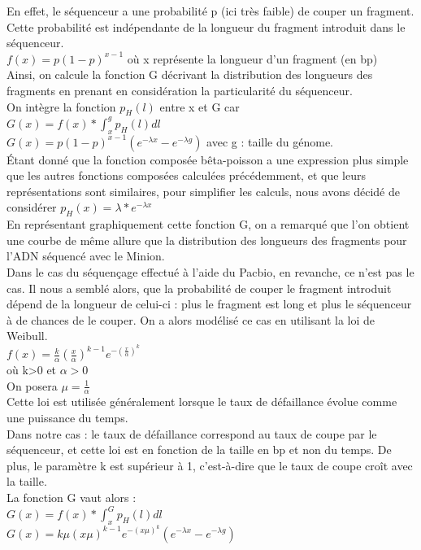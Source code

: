 \documentclass[11pt,a4paper]{article} %
\begin{document}
En effet, le séquenceur a une probabilité p (ici très faible) de couper un fragment.
Cette probabilité est indépendante de la longueur du fragment introduit dans le séquenceur. \\
$f(x) = p(1-p)^{x-1}$ où x représente la longueur d'un fragment (en bp) \\
Ainsi, on calcule la fonction G décrivant la distribution des longueurs des fragments en prenant en considération la particularité du séquenceur. \\
On intègre la fonction $p_H(l)$ entre x et G car \\
$G(x)=f(x)*\int_{x}^{g}p_H(l)dl$ \\
$G(x)=p(1-p)^{x-1}( e^{-\lambda x}- e^{-\lambda g})$ avec g : taille du génome.\\
Étant donné que la fonction composée bêta-poisson a une expression plus simple que les autres fonctions composées calculées précédemment, et que leurs représentations sont similaires, pour simplifier les calculs, nous avons décidé de considérer $p_H(x) = \lambda*e^{-\lambda x}$ \\
En représentant graphiquement cette fonction G, on a remarqué que l'on obtient une courbe de même allure que la distribution des longueurs des fragments pour l'ADN séquencé avec le Minion.\\
Dans le cas du séquençage effectué à l'aide du Pacbio, en revanche, ce n'est pas le cas. Il nous a semblé alors, que la probabilité de couper le fragment introduit dépend de la longueur de celui-ci : plus le fragment est long et plus le séquenceur à de chances de le couper. On a alors modélisé ce cas en utilisant la loi de Weibull.\\
$f(x) = \frac{k}{\alpha} (\frac{x}{\alpha})^{k-1}e^{-(\frac{x}{\alpha})^k}$ \\
où k>0 et $\alpha>0$\\
On posera $\mu = \frac{1}{\alpha}$\\
Cette loi est utilisée généralement lorsque le taux de défaillance évolue comme une puissance du temps.\\ Dans notre cas : le taux de défaillance correspond au taux de coupe par le séquenceur, et cette loi est en fonction de la taille en bp et non du temps. De plus, le paramètre k est supérieur à 1, c'est-à-dire que le taux de coupe croît avec la taille. \\
La fonction G vaut alors :  \\
$G(x)=f(x)*\int_{x}^{G}p_H(l)dl$ \\
$G(x)= k \mu (x \mu)^{k-1}e^{-(x \mu)^k}( e^{-\lambda x}- e^{-\lambda g})$ \\
\end{document}

